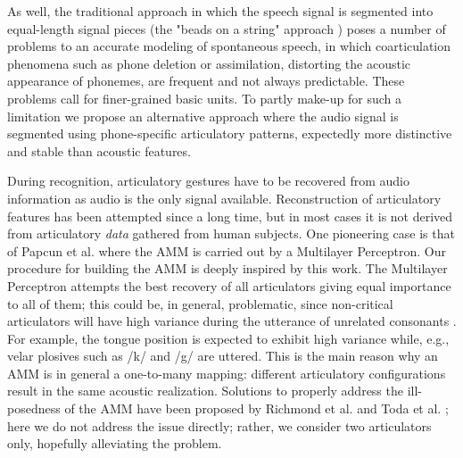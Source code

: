 As well, the traditional approach in which the speech signal is segmented into equal-length signal
pieces (the "beads on a string" approach \cite{ostendorf}) poses a number of problems to an accurate modeling of
spontaneous speech, in which coarticulation phenomena such as phone deletion or assimilation,
distorting the acoustic appearance of phonemes, are frequent and not always predictable. These problems
call for finer-grained basic units. To partly make-up for such a limitation we propose
an alternative approach where the audio signal is segmented using phone-specific articulatory patterns,
expectedly more distinctive and stable than acoustic features.


During recognition, articulatory gestures have to be recovered 
from audio information as audio is the only signal available.
Reconstruction of articulatory features has been attempted since a long
time, but in most cases it is not derived from articulatory \emph{data}
gathered from human subjects. One pioneering case is that of Papcun
et al. \cite{papcun} where the AMM is carried out by a Multilayer Perceptron.
Our procedure for building the AMM is deeply inspired by this work.
The Multilayer Perceptron attempts the best recovery of all articulators giving equal importance
to all of them; this could be, in general, problematic, since non-critical articulators will have
high variance during the utterance of unrelated consonants \cite{papcun,rose}.
For example, the tongue position is expected to exhibit high variance while, e.g., velar plosives
such as /k/ and /g/ are uttered. This is the main reason why an AMM is in general a one-to-many mapping: different articulatory configurations result in the same acoustic realization. Solutions to properly address the ill-posedness
of the AMM have been proposed by Richmond et al. \cite{richmond} and Toda et al. \cite{toda}; here we do
not address the issue directly; rather, we consider two articulators only, hopefully alleviating the problem.

